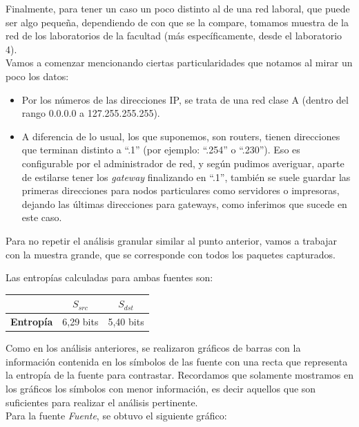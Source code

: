 \indent Finalmente, para tener un caso un poco distinto al de una red laboral, que puede ser algo pequeña, dependiendo de con que se la compare, tomamos muestra de la red de los laboratorios de la facultad (más específicamente, desde el laboratorio 4).\\
\indent Vamos a comenzar mencionando ciertas particularidades que notamos al mirar un poco los datos:
\begin{itemize}
	\item Por los números de las direcciones IP, se trata de una red clase A (dentro del rango 0.0.0.0 a 127.255.255.255).
	\item A diferencia de lo usual, los que suponemos, son routers, tienen direcciones que terminan distinto a ``.1'' (por ejemplo: ``.254'' o ``.230''). Eso es configurable por el administrador de red, y según pudimos averiguar, aparte de estilarse tener los \textit{gateway} finalizando en ``.1'', también se suele guardar las primeras direcciones para nodos particulares como servidores o impresoras, dejando las últimas direcciones para gateways, como inferimos que sucede en este caso.
\end{itemize}
\indent Para no repetir el análisis granular similar al punto anterior, vamos a trabajar con la muestra grande, que se corresponde con todos los paquetes capturados.

\indent Las entropías calculadas para ambas fuentes son:\\

\begin{center}
	\begin{tabular}{ | c | c | c |} \hline
	   & \textbf{$S_{src}$} & \textbf{$S_{dst}$} \\ \hline
	  	\textbf{Entropía} & 6,29 bits & 5,40 bits \\ \hline
	\end{tabular}
\end{center}

\indent Como en los análisis anteriores, se realizaron gráficos de barras con la información contenida en los símbolos de las fuente con una recta que representa la entropía de la fuente para contrastar. Recordamos que solamente mostramos en los gráficos los símbolos con menor información, es decir aquellos que son suficientes para realizar el análisis pertinente.\\

\indent Para la fuente \textit{Fuente}, se obtuvo el siguiente gráfico:\\


